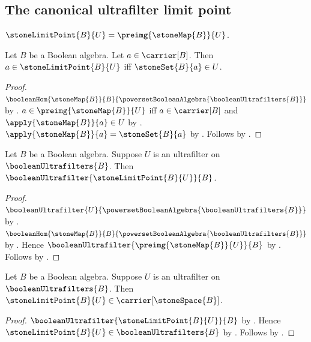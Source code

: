 \subsection{The canonical ultrafilter limit point}

\begin{definition}\label{stone_limit_point}
    $\stoneLimitPoint{B}{U}=\preimg{\stoneMap{B}}{U}$.
\end{definition}

\begin{proposition}\label{stone_limit_point_iff}
    Let $B$ be a Boolean algebra.
    Let $a\in\carrier[B]$.
    Then $a\in\stoneLimitPoint{B}{U}$ iff
        $\stoneSet{B}{a}\in U$.
\end{proposition}
\begin{proof}
    $\booleanHom
        {\stoneMap{B}}
        {B}
        {\powersetBooleanAlgebra{\booleanUltrafilters{B}}}$ by
        .
    $a\in\preimg{\stoneMap{B}}{U}$ iff
        $a\in\carrier[B]$ and
        $\apply{\stoneMap{B}}{a}\in U$ by
        .
    $\apply{\stoneMap{B}}{a}=\stoneSet{B}{a}$ by
        .
    Follows by .
\end{proof}

\begin{theorem}\label{stone_limit_point_is_boolean_ultrafilter}
    Let $B$ be a Boolean algebra.
    Suppose $U$ is an ultrafilter on
        $\booleanUltrafilters{B}$.
    Then $\booleanUltrafilter{\stoneLimitPoint{B}{U}}{B}$.
\end{theorem}
\begin{proof}
    $\booleanUltrafilter
        {U}
        {\powersetBooleanAlgebra{\booleanUltrafilters{B}}}$ by
        .
    $\booleanHom
        {\stoneMap{B}}
        {B}
        {\powersetBooleanAlgebra{\booleanUltrafilters{B}}}$ by
        .
    Hence $\booleanUltrafilter
        {\preimg{\stoneMap{B}}{U}}{B}$ by
        .
    Follows by .
\end{proof}

\begin{proposition}\label{stone_limit_point_is_stone_space_point}
    Let $B$ be a Boolean algebra.
    Suppose $U$ is an ultrafilter on
        $\booleanUltrafilters{B}$.
    Then $\stoneLimitPoint{B}{U}\in\carrier[\stoneSpace{B}]$.
\end{proposition}
\begin{proof}
    $\booleanUltrafilter{\stoneLimitPoint{B}{U}}{B}$ by
        .
    Hence $\stoneLimitPoint{B}{U}\in
        \booleanUltrafilters{B}$ by
        .
    Follows by .
\end{proof}

